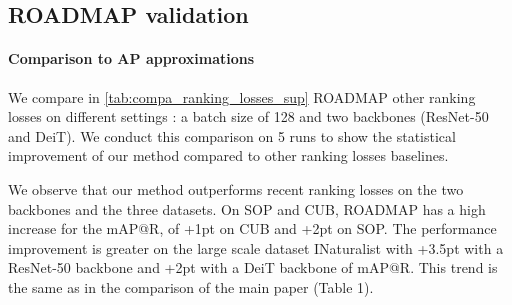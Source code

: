 \subsection{ROADMAP validation}

\paragraph*{Comparison to AP approximations} We compare in \cref{tab:compa_ranking_losses_sup} ROADMAP \vs other ranking losses on different settings : a batch size of 128 and two backbones (ResNet-50 and DeiT). We conduct this comparison on 5 runs to show the statistical improvement of our method compared to other ranking losses baselines.

We observe that our method outperforms recent ranking losses on the two backbones and the three datasets. On SOP and CUB, ROADMAP has a high increase for the mAP@R, of +1pt on CUB and +2pt on SOP. The performance improvement is greater on the large scale dataset INaturalist with +3.5pt with a ResNet-50 backbone and +2pt with a DeiT backbone of mAP@R. This trend is the same as in the comparison of the main paper (Table 1).

